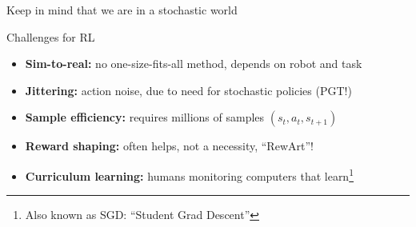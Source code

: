 \documentclass[10pt, aspectratio=1610]{beamer}
\begin{document}

\begin{frame}{Keep in mind that we are in a stochastic world}
    \begin{figure}
        \centering
    \end{figure}
\end{frame}

\begin{frame}{Challenges for RL}
    \begin{itemize}
        \item \textbf{Sim-to-real:} no one-size-fits-all method, depends on robot and task
        \item \textbf{Jittering:} action noise, due to need for stochastic policies (PGT!)
        \item \textbf{Sample efficiency:} requires millions of samples $(s_t, a_t, s_{t+1})$
        \item \textbf{Reward shaping:} often helps, not a necessity, ``RewArt''!
        \item \textbf{Curriculum learning:} humans monitoring computers that learn\footnote{ Also known as SGD: ``Student Grad Descent''}
    \end{itemize}
\end{frame}
\end{document}
